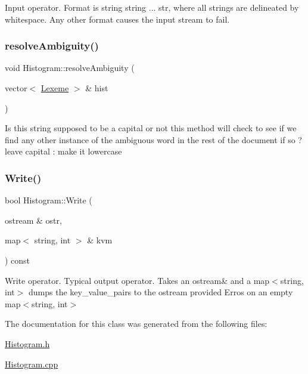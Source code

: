 Input operator. Format is string string ... str, where all strings are delineated by whitespace. Any other format causes the input stream to fail. \mbox{\label{classHistogram_a5adb0e9b69168b662af9f84cbf29d5a0}} 
\subsubsection{\texorpdfstring{resolve\+Ambiguity()}{resolveAmbiguity()}}
{\footnotesize\ttfamily void Histogram\+::resolve\+Ambiguity (\begin{DoxyParamCaption}\item[{vector$<$ \hyperlink{classLexeme}{Lexeme} $>$ \&}]{hist }\end{DoxyParamCaption})}

Is this string supposed to be a capital or not this method will check to see if we find any other instance of the ambiguous word in the rest of the document if so ? leave capital \+: make it lowercase \mbox{\label{classHistogram_af8b644d9dcb8dd86fb3420640de72ab2}} 
\subsubsection{\texorpdfstring{Write()}{Write()}}
{\footnotesize\ttfamily bool Histogram\+::\+Write (\begin{DoxyParamCaption}\item[{ostream \&}]{ostr,  }\item[{map$<$ string, int $>$ \&}]{kvm }\end{DoxyParamCaption}) const}

Write operator. Typical output operator. Takes an ostream\& and a map$<$string, int$>$ dumps the key\+\_\+value\+\_\+pairs to the ostream provided Erros on an empty map$<$string, int$>$ 

The documentation for this class was generated from the following files\+:\begin{DoxyCompactItemize}
\item 
\hyperlink{Histogram_8h}{Histogram.\+h}\item 
\hyperlink{Histogram_8cpp}{Histogram.\+cpp}\end{DoxyCompactItemize}
